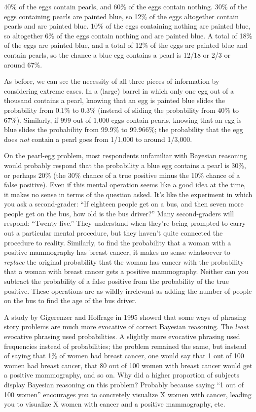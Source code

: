 {
 40\% of the eggs contain pearls, and 60\% of the eggs contain
nothing. 30\% of the eggs containing pearls are painted blue, so 12\%
of the eggs altogether contain pearls and are painted blue. 10\% of the
eggs containing nothing are painted blue, so altogether 6\% of the eggs
contain nothing and are painted blue. A total of 18\% of the eggs are
painted blue, and a total of 12\% of the eggs are painted blue and
contain pearls, so the chance a blue egg contains a pearl is 12/18 or
2/3 or around 67\%.}

{
 As before, we can see the necessity of all three pieces of
information by considering extreme cases. In a (large) barrel in which
only one egg out of a thousand contains a pearl, knowing that an egg is
painted blue slides the probability from 0.1\% to 0.3\% (instead of
sliding the probability from 40\% to 67\%). Similarly, if 999 out of
1,000 eggs contain pearls, knowing that an egg is blue slides the
probability from 99.9\% to 99.966\%; the probability that the egg does
\textit{not} contain a pearl goes from 1/1,000 to around 1/3,000.}

{
 On the pearl-egg problem, most respondents unfamiliar with
Bayesian reasoning would probably respond that the probability a blue
egg contains a pearl is 30\%, or perhaps 20\% (the 30\% chance of a
true positive minus the 10\% chance of a false positive). Even if this
mental operation seems like a good idea at the time, it makes no sense
in terms of the question asked. It's like the
experiment in which you ask a second-grader: ``If
eighteen people get on a bus, and then seven more people get on the
bus, how old is the bus driver?'' Many second-graders
will respond: ``Twenty-five.'' They
understand when they're being prompted to carry out a
particular mental procedure, but they haven't quite
connected the procedure to reality. Similarly, to find the probability
that a woman with a positive mammography has breast cancer, it makes no
sense whatsoever to \textit{replace} the original probability that the
woman has cancer with the probability that a woman with breast cancer
gets a positive mammography. Neither can you subtract the probability
of a false positive from the probability of the true positive. These
operations are as wildly irrelevant as adding the number of people on
the bus to find the age of the bus driver.}

{
 A study by Gigerenzer and Hoffrage in 1995 showed that some ways
of phrasing story problems are much more evocative of correct Bayesian
reasoning. The \textit{least} evocative phrasing
used probabilities. A slightly more evocative phrasing used frequencies
instead of probabilities; the problem remained the same, but instead of
saying that 1\% of women had breast cancer, one would say that 1 out of
100 women had breast cancer, that 80 out of 100 women with breast
cancer would get a positive mammography, and so on. Why did a higher
proportion of subjects display Bayesian reasoning on this problem?
Probably because saying ``1 out of 100
women'' encourages you to concretely visualize X
women with cancer, leading you to visualize X women with cancer and a
positive mammography, etc.}

